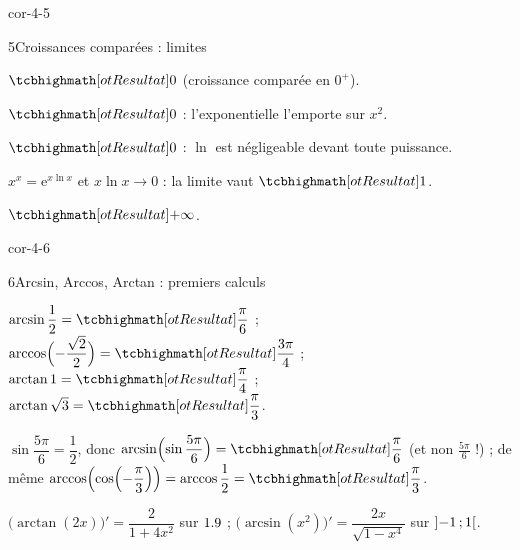 \begin{blocLivre}{cor-4-5}
\begin{corrige}{5}{Croissances comparées : limites}
\begin{questions}
  \item $\res{0}$ (croissance comparée en $0^{+}$).
  \item $\res{0}$ : l'exponentielle l'emporte sur $x^{2}$.
  \item $\res{0}$ : $\ln$ est négligeable devant toute puissance.
  \item $x^{x}=\mathrm{e}^{x\ln x}$ et $x\ln x\to0$ : la limite vaut $\res{1}$.
  \item $\res{+\infty}$.
\end{questions}
\end{corrige}
\end{blocLivre}

\begin{blocLivre}{cor-4-6}
\begin{corrige}{6}{Arcsin, Arccos, Arctan : premiers calculs}
\demarche{Chercher l'angle dans l'intervalle image : $[-\frac{\pi}{2},\frac{\pi}{2}]$, $[0,\pi]$ ou $]-\frac{\pi}{2},\frac{\pi}{2}[$.}
\begin{questions}
  \item $\arcsin\dfrac12=\res{\dfrac{\pi}{6}}$ ;\quad
    $\arccos\Bigl(-\dfrac{\sqrt2}{2}\Bigr)=\res{\dfrac{3\pi}{4}}$ ;\quad
    $\arctan1=\res{\dfrac{\pi}{4}}$ ;\quad $\arctan\sqrt3=\res{\dfrac{\pi}{3}}$.
  \item $\sin\dfrac{5\pi}{6}=\dfrac12$, donc
    $\arcsin\Bigl(\sin\dfrac{5\pi}{6}\Bigr)=\res{\dfrac{\pi}{6}}$
    (et non $\frac{5\pi}{6}$ !) ; de même
    $\arccos\Bigl(\cos\Bigl(-\dfrac{\pi}{3}\Bigr)\Bigr)=\arccos\dfrac12=\res{\dfrac{\pi}{3}}$.
  \item $\bigl(\arctan(2x)\bigr)'=\dfrac{2}{1+4x^{2}}$ sur $1.9$ ;
    $\bigl(\arcsin(x^{2})\bigr)'=\dfrac{2x}{\sqrt{1-x^{4}}}$ sur $\mathopen{]}-1\,{;}\,1\mathclose{[}$.
\end{questions}
\end{corrige}
\end{blocLivre}

